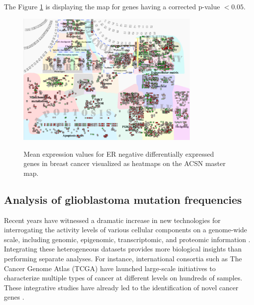 The Figure \ref{fig:mainz} is displaying the map for genes having a
corrected p-value $< 0.05$. 

\begin{figure}[!ht]
  \caption{Mean expression values for ER negative differentially expressed
  genes in breast cancer visualized as heatmaps on the ACSN master map.} 
  \centering
  \includegraphics[width=0.8\textwidth]{figures/mainz_acsn.png}
  \label{fig:mainz}
\end{figure}

\subsection{Analysis of glioblastoma mutation frequencies}

Recent years have witnessed a dramatic increase in new technologies for
interrogating the activity levels of various cellular components on a
genome-wide scale, including genomic, epigenomic, transcriptomic, and proteomic
information \citep{hawkins2010next}. Integrating these heterogeneous datasets
provides more biological insights than performing separate analyses. For
instance, international consortia such as The Cancer Genome Atlas (TCGA) have
launched large-scale initiatives to characterize multiple types of cancer at
different levels on hundreds of samples.  These integrative studies have
already led to the identification of novel cancer genes
\citep{mclendon2008comprehensive}. 

